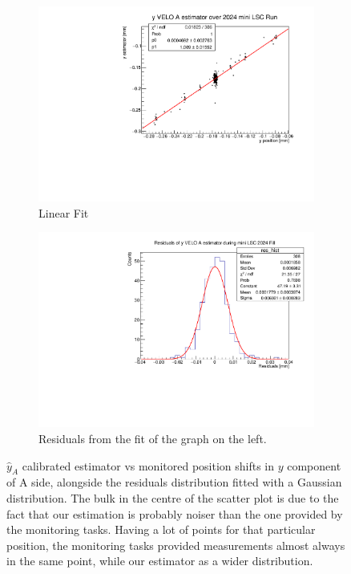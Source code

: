 \begin{figure}
    \centering
    \begin{subfigure}{0.48\textwidth}
    \includegraphics[width=\linewidth]{figures/yVeloA_fit_comparison.pdf}
    \caption{Linear Fit}\label{fig:yAfit_comparison}
    \end{subfigure}
    \begin{subfigure}{0.48\textwidth}
    \includegraphics[width=\linewidth]{figures/yVeloA_res_comparison.pdf}
    \caption{Residuals from the fit of the graph on the left. }\label{fig:yAres_comparison}
    \end{subfigure}
    \caption{$\hat{y}_{A}$ calibrated estimator vs monitored position shifts in $y$ component of A side, alongside the residuals distribution fitted with a Gaussian distribution. The bulk in the centre of the scatter plot is due to the fact that our estimation is probably noiser than the one provided by the monitoring tasks. Having a lot of points for that particular position, the monitoring tasks provided measurements almost always in the same point, while our estimator as a wider distribution.}
    \label{fig:yA_comparison}
\end{figure}

